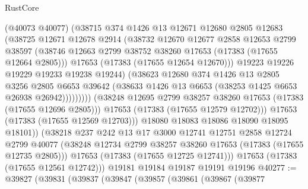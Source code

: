 \begin{lexlean}{RustCore}
\begin{coremodule}
                        (@40073 @40077)
                        (@38715
                          @374
                          @1426
                          @13
                          @12671
                          @12680
                          @2805
                          @12683
                          (@38725
                            @12671
                            @12678
                            @2914
                            (@38732
                              @12670
                              @12677
                              @2858
                              @12653
                              @2799
                              @38597
                              (@38746
                                @12663
                                @2799
                                @38752
                                @38260
                                @17653
                                (@17383 (@17655 @12664 @2805)))
                              @17653
                              (@17383 (@17655 @12654 @12670)))
                            @19223
                            @19226
                            @19229
                            @19233
                            @19238
                            @19244)
                          (@38623
                            @12680
                            @374
                            @1426
                            @13
                            @2805
                            @3256
                            @2805
                            @6653
                            @39642
                            (@38633 @1426 @13 @6653 (@38253 @1425 @6653 @26938 @26942)))))))))
              (@38248 @12695 @2799 @38257 @38260 @17653 (@17383 (@17655 @12696 @2805)))
              @17653
              (@17383 (@17655 @12579 @12702)))
            @17653
            (@17383 (@17655 @12569 @12703)))
          @18080
          @18083
          @18086
          @18090
          @18095
          @18101))
      (@38218
        @237
        @242
        @13
        @17
        @3000
        @12741
        @12751
        @2858
        @12724
        @2799
        @40077
        (@38248 @12734 @2799 @38257 @38260 @17653 (@17383 (@17655 @12735 @2805)))
        @17653
        (@17383 (@17655 @12725 @12741)))
      @17653
      (@17383 (@17655 @12561 @12742)))
    @19181
    @19184
    @19187
    @19191
    @19196
@40277 := @39827
    (@39831
      (@39837
        (@39847
          (@39857
            (@39861
              (@39867
                (@39877

\end{coremodule}
\end{lexlean}
